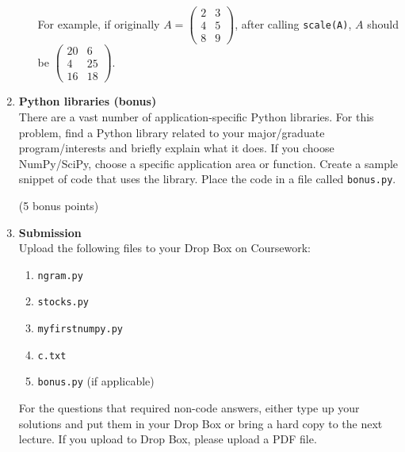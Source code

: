 \documentclass{article}
\newcounter{points}
\newcounter{bonuspoints}
\newcommand\setbonuspoints[1]{\addtocounter{bonuspoints}{#1}(#1 bonus points)}
\newcommand\printpoints{Total number of points: \value{\thepoints}}
\begin{document}
\begin{enumerate}
\begin{enumerate}
For example, if originally $A = \begin{pmatrix} 2 & 3 \\ 4 & 5 \\ 8 & 9 \end{pmatrix}$, after calling \texttt{scale(A)}, $A$ should be $\begin{pmatrix} 20 & 6 \\ 4 & 25 \\ 16 & 18 \end{pmatrix}$.

\end{enumerate}

\item \textbf{Python libraries (bonus)} \\
There are a vast number of application-specific Python libraries.  For this problem, find a Python library related to your major/graduate program/interests and briefly explain what it does.  If you choose NumPy/SciPy, choose a specific application area or function.  Create a sample snippet of code that uses the library.  Place the code in a file called \texttt{bonus.py}.  \setbonuspoints {5} 


\item \textbf{Submission} \\
Upload the following files to your Drop Box on Coursework:
\begin{enumerate}
\item \texttt{ngram.py}
\item \texttt{stocks.py}
\item \texttt{myfirstnumpy.py}
\item \texttt{c.txt}
\item \texttt{bonus.py} (if applicable)
\end{enumerate}

For the questions that required non-code answers, either type up your solutions and put them in your Drop Box or bring a hard copy to the next lecture.  If you upload to Drop Box, please upload a PDF file.

\end{enumerate}
\end{document}
